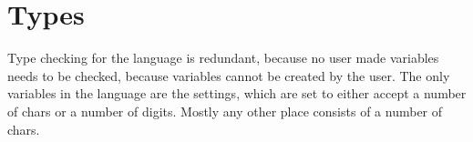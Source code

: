 \section{Types}
Type checking for the language is redundant, because no user made variables needs to be checked, because variables cannot be created by the user. The only variables in the language are the settings, which are set to either accept a number of chars or a number of digits. Mostly any other place consists of a number of chars.